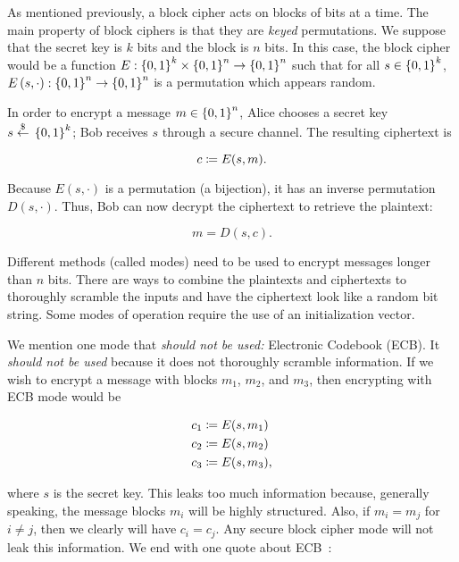 As mentioned previously, a \gls{block cipher} acts on blocks of bits
at a time.
The main property of \glspl{block cipher} is that they are
\emph{keyed} \glspl{permutation}.
We suppose that the secret key is $k$ bits and the block is $n$ bits.
In this case, the \gls{block cipher} would be a function
$E:\left\{ 0,1 \right\}^{k}\times\left\{ 0,1 \right\}^{n}\to\left\{ 0,1 \right\}^{n}$
such that for all $s\in\left\{ 0,1 \right\}^{k}$,
$E\left( s,\cdot \right):\left\{ 0,1 \right\}^{n}\to\left\{ 0,1 \right\}^{n}$
is a \gls{permutation} which appears random.

In order to encrypt a message $m\in\left\{ 0,1 \right\}^{n}$,
Alice chooses a secret key $s\stackrel{\$}{\leftarrow}{}\left\{ 0,1 \right\}^{k}$;
Bob receives $s$ through a \gls{secure channel}.
The resulting ciphertext is

\begin{equation}
    c \coloneqq{} E(s,m).
\end{equation}

\noindent
Because $E(s,\cdot)$ is a \gls{permutation} (a bijection),
it has an inverse permutation $D(s,\cdot)$.
Thus, Bob can now decrypt the ciphertext to retrieve the plaintext:

\begin{equation}
    m = D(s,c).
\end{equation}

Different methods (called modes) need to be used to encrypt messages
longer than $n$ bits.
There are ways to combine the plaintexts and ciphertexts
to thoroughly scramble the inputs and have the ciphertext
look like a random bit string.
Some modes of operation require the use of an \gls{initialization vector}.

We mention one mode that \emph{should not be used:}
Electronic Codebook (ECB).
It \emph{should not be used} because it does not thoroughly scramble
information.
If we wish to encrypt a message with blocks $m_{1}$, $m_{2}$, and $m_{3}$,
then encrypting with ECB mode would be

\begin{align}
    c_{1} &\coloneqq{} E(s,m_{1})
        \nonumber\\
    c_{2} &\coloneqq{} E(s,m_{2})
        \nonumber\\
    c_{3} &\coloneqq{} E(s,m_{3}),
\end{align}

\noindent
where $s$ is the secret key.
This leaks too much information because, generally speaking,
the message blocks $m_{i}$ will be highly structured.
Also, if $m_{i} = m_{j}$ for $i\ne j$,
then we clearly will have $c_{i} = c_{j}$.
Any secure \gls{block cipher} mode will not leak this information.
We end with one quote about ECB~\cite[Chapter 4.2]{CryptoEng}:

